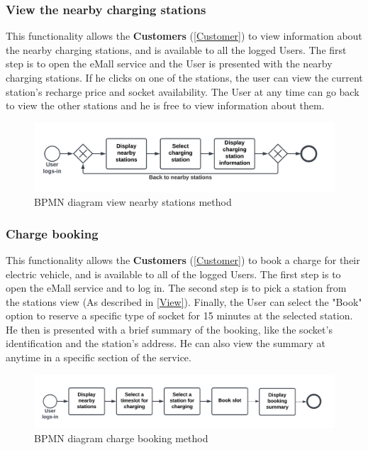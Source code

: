 \subsubsection{View the nearby charging stations}
This functionality allows the \textbf{Customers} (\ref{Customer}) to view information about the nearby charging stations, and is available to all  the logged Users. 
The first step is to open the eMall service and the User is presented with the nearby charging stations. 
If he clicks on one of the stations, the user can view the current station's recharge price and socket availability.
The User at any time can go back to view the other stations and he is free to view information about them.\label{View}
\begin{figure}[H]
    \begin{center}
        \includegraphics[width=\textwidth]{img/fun-view-info.png}
        \caption{BPMN diagram view nearby stations method}
    \end{center}
\end{figure}
\subsubsection{Charge booking}
This functionality allows the \textbf{Customers} (\ref{Customer}) to book a charge for their electric vehicle, and is available to all of the logged Users. 
The first step is to open the eMall service and to log in. The second step is to pick a station from the stations view (As described in \ref{View}).
Finally, the User can select the "Book" option to reserve a specific type of socket for 15 minutes at the selected station.
He then is presented with a brief summary of the booking, like the socket's identification and the station's address.
He can also view the summary at anytime in a specific section of the service.\label{Book} 
\begin{figure}[H]
    \begin{center}
        \includegraphics[width=\textwidth]{img/fun-book-slot.png}
        \caption{BPMN diagram charge booking method}
    \end{center}
\end{figure}
